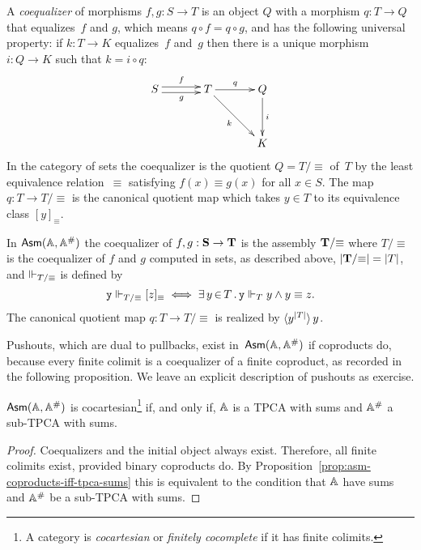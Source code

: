 A \emph{coequalizer} of morphisms $f, g : S \to T$ is an object $Q$
with a morphism $q : T \to Q$ that equalizes~$f$ and $g$, which means
$q \circ f = q \circ g$, and has the following universal property: if
$k : T \to K$ equalizes~$f$ and~$g$ then there is a unique morphism $i
: Q \to K$ such that $k = i \circ q$:
%
\begin{equation*}
  \xymatrix@+1em{
    {S}
    \ar@<+0.25em>[r]^{f}
    \ar@<-0.25em>[r]_{g}
    &
    {T}
    \ar[rd]_{k}
    \ar[r]^{q}
    &
    {Q}
    \ar[d]^{i}
    \\
    & & 
    {K}
  }
\end{equation*}
%
In the category of sets the coequalizer is the quotient $Q =
T/{\equiv}$ of~$T$ by the least equivalence relation~$\equiv$
satisfying $f(x) \equiv g(x)$ for all $x \in S$. The map $q : T \to
T/{\equiv}$ is the canonical quotient map which takes $y \in T$ to its
equivalence class $[y]_{\equiv}$.

In $\AsmA$ the coequalizer of $f, g : \asm{S} \to \asm{T}$ is the
assembly $\asm{T}/{\equiv}$ where $T/{\equiv}$ is the coequalizer of
$f$ and $g$ computed in sets, as described above, $|\asm{T}/{\equiv}|
= |T|$, and $\rz_{T/{\equiv}}$ is defined by
%
\begin{equation*}
  \R{y} \rz_{T/{\equiv}} [z]_{\equiv} \iff
  \xsome{y}{T}{\R{y} \rz_T y \land y \equiv z}.
\end{equation*}
%
The canonical quotient map $q : T \to T/{\equiv}$ is realized by
$\xpcalam{\annot{y}{|T|}}{y}$.

Pushouts, which are dual to pullbacks, exist in~$\AsmA$ if coproducts
do, because every finite colimit is a coequalizer of a finite
coproduct, as recorded in the following proposition. We leave an
explicit description of pushouts as exercise.

\begin{proposition}
  \label{prop:asm-cocartesian}%
  $\AsmA$ is cocartesian\footnote{A category is \emph{cocartesian} or
    \emph{finitely cocomplete} if it has finite colimits.} if, and
  only if, $\AA$ is a TPCA with sums and $\compAA$ a sub-TPCA with
  sums.
\end{proposition}

\begin{proof}
  Coequalizers and the initial object always exist. Therefore, all
  finite colimits exist, provided binary coproducts do. By
  Proposition~\ref{prop:asm-coproducts-iff-tpca-sums} this is
  equivalent to the condition that $\AA$ have sums and $\compAA$ be a
  sub-TPCA with sums.
\end{proof}


